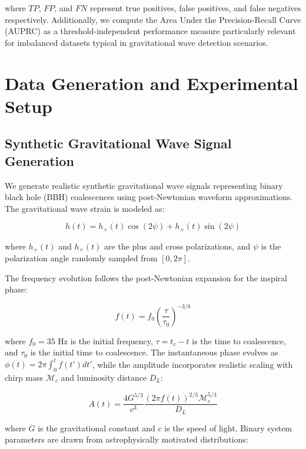 \documentclass{iopjournal}
\begin{document}
where $TP$, $FP$, and $FN$ represent true positives, false positives, and false negatives respectively. Additionally, we compute the Area Under the Precision-Recall Curve (AUPRC) as a threshold-independent performance measure particularly relevant for imbalanced datasets typical in gravitational wave detection scenarios.

\section{Data Generation and Experimental Setup}

\subsection{Synthetic Gravitational Wave Signal Generation}

We generate realistic synthetic gravitational wave signals representing binary black hole (BBH) coalescences using post-Newtonian waveform approximations. The gravitational wave strain is modeled as:

\begin{equation}
h(t) = h_+(t) \cos(2\psi) + h_\times(t) \sin(2\psi)
\end{equation}

where $h_+(t)$ and $h_\times(t)$ are the plus and cross polarizations, and $\psi$ is the polarization angle randomly sampled from $[0, 2\pi]$.

The frequency evolution follows the post-Newtonian expansion for the inspiral phase:

\begin{equation}
f(t) = f_0 \left(\frac{\tau}{\tau_0}\right)^{-3/8}
\end{equation}

where $f_0 = 35$ Hz is the initial frequency, $\tau = t_c - t$ is the time to coalescence, and $\tau_0$ is the initial time to coalescence. The instantaneous phase evolves as $\phi(t) = 2\pi \int_0^t f(t') dt'$, while the amplitude incorporates realistic scaling with chirp mass $\mathcal{M}_c$ and luminosity distance $D_L$:

\begin{equation}
A(t) = \frac{4G^{5/3}}{c^3} \frac{(2\pi f(t))^{2/3} \mathcal{M}_c^{5/3}}{D_L}
\end{equation}

where $G$ is the gravitational constant and $c$ is the speed of light. Binary system parameters are drawn from astrophysically motivated distributions:
\end{document}
